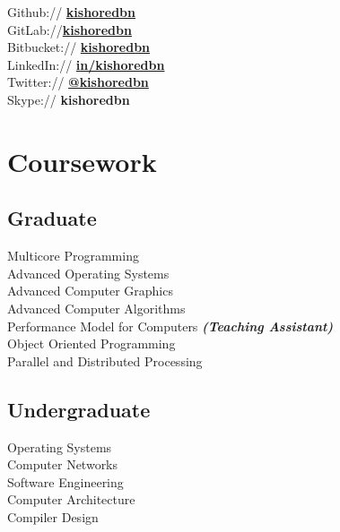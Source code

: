 \documentclass[letterpaper]{kishore-resume} %
\begin{document}
\begin{minipage}[t]{0.33\textwidth}
Github:// \href{https://github.com/kishoredbn}{\bf kishoredbn} \\
GitLab://\href{cse.eecs.ucf.edu/gitlab/u/kishoredbn}{\bf kishoredbn} \\
Bitbucket:// \href{https://bitbucket.org/kishoredbn/}{\bf kishoredbn} \\
LinkedIn:// \href{https://www.linkedin.com/in/kishoredbn}{\bf in/kishoredbn} \\
Twitter:// \href{https://twitter.com/kishoredbn}{\bf @kishoredbn} \\
Skype:// \textbf{kishoredbn} 



\section{Coursework}

\subsection{Graduate}

Multicore Programming\\
Advanced Operating Systems \\
Advanced Computer Graphics \\
Advanced Computer Algorithms \\
Performance Model for Computers
{\footnotesize \textit{\textbf{(Teaching Assistant) }}} \\
Object Oriented Programming\\
Parallel and Distributed Processing
\sectionspace %


\subsection{Undergraduate}


Operating Systems\\
Computer Networks\\
Software Engineering\\
Computer Architecture\\
Compiler Design\\
\sectionspace %


\end{minipage}
\end{document}
